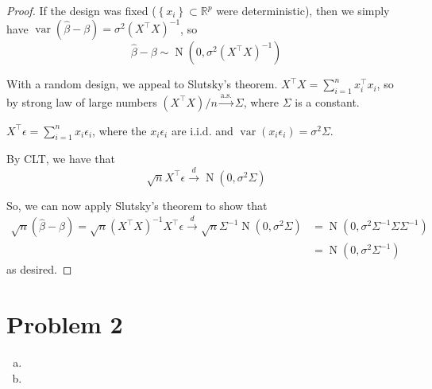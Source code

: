 \documentclass[letterpaper]{article}
\begin{document}
\begin{enumerate}[(a)]
\begin{proof}
    If the design was fixed ($\left\{x_i\right\} \subset \mathbb{R}^p$ were
    deterministic), then we simply have
    $\operatorname{var}\left(\hat{\beta} - \beta\right) = \sigma^2\left(X^\top
      X\right)^{-1}$, so
    \begin{equation*}
      \hat{\beta} - \beta \sim \operatorname{N}\left(0, \sigma^2\left(X^\top X\right)^{-1}\right)
    \end{equation*}
    

    With a random design, we appeal to Slutsky's theorem.
    $X^\top X = \sum_{i=1}^n x_i^\top x_i$, so by strong law of large numbers
    $\left(X^\top X\right)/n \xrightarrow{\text{a.s.}} \Sigma$, where $\Sigma$
    is a constant.

    $X^\top\epsilon = \sum_{i=1}^n x_i\epsilon_i$, where the $x_i\epsilon_i$ are
    i.i.d. and $\operatorname{var}\left(x_i\epsilon_i\right) = \sigma^2\Sigma$.

    By CLT, we have that
    \begin{equation*}
      \sqrt{n}X^\top\epsilon \xrightarrow{d} \operatorname{N}\left(0, \sigma^2\Sigma\right)
    \end{equation*}

    So, we can now apply Slutsky's theorem to show that
    \begin{align*}
      \sqrt{n}\left(\hat{\beta} - \beta\right)
      = \sqrt{n}\left(X^\top X\right)^{-1}X^\top\epsilon
      \xrightarrow{d} \sqrt{n}\Sigma^{-1}\operatorname{N}\left(0, \sigma^2\Sigma\right)
      &= \operatorname{N}\left(0, \sigma^2\Sigma^{-1}\Sigma\Sigma^{-1}\right) \\
      &= \operatorname{N}\left(0, \sigma^2\Sigma^{-1}\right)
    \end{align*}
    as desired.
  \end{proof}
\end{enumerate}

\section*{Problem 2}

\begin{enumerate}[(a)]
\item 
\item 
\end{enumerate}
\end{document}
